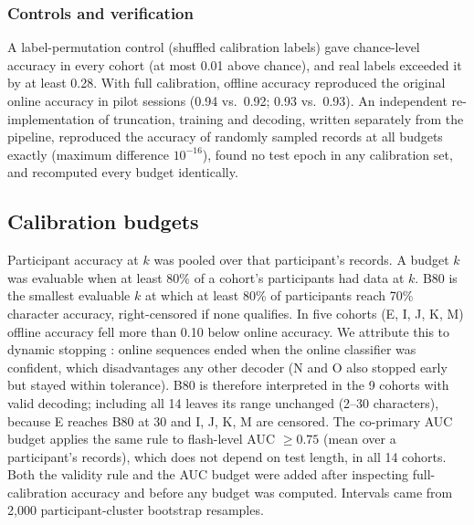 \documentclass[conference]{IEEEtran}
\begin{document}
\subsubsection{Controls and verification}
A label-permutation control (shuffled calibration labels) gave chance-level accuracy in every cohort (at most 0.01 above chance), and real labels exceeded it by at least 0.28. With full calibration, offline accuracy reproduced the original online accuracy in pilot sessions (0.94 vs.\ 0.92; 0.93 vs.\ 0.93). An independent re-implementation of truncation, training and decoding, written separately from the pipeline, reproduced the accuracy of randomly sampled records at all budgets exactly (maximum difference $10^{-16}$), found no test epoch in any calibration set, and recomputed every budget identically.

\subsection{Calibration budgets}
Participant accuracy at $k$ was pooled over that participant's records. A budget $k$ was evaluable when at least 80\% of a cohort's participants had data at $k$. B80 is the smallest evaluable $k$ at which at least 80\% of participants reach 70\% character accuracy, right-censored if none qualifies. In five cohorts (E, I, J, K, M) offline accuracy fell more than 0.10 below online accuracy. We attribute this to dynamic stopping \cite{mainsah2015}: online sequences ended when the online classifier was confident, which disadvantages any other decoder (N and O also stopped early but stayed within tolerance). B80 is therefore interpreted in the 9 cohorts with valid decoding; including all 14 leaves its range unchanged (2--30 characters), because E reaches B80 at 30 and I, J, K, M are censored. The co-primary AUC budget applies the same rule to flash-level AUC $\geq 0.75$ (mean over a participant's records), which does not depend on test length, in all 14 cohorts. Both the validity rule and the AUC budget were added after inspecting full-calibration accuracy and before any budget was computed. Intervals came from 2{,}000 participant-cluster bootstrap resamples.
\end{document}
